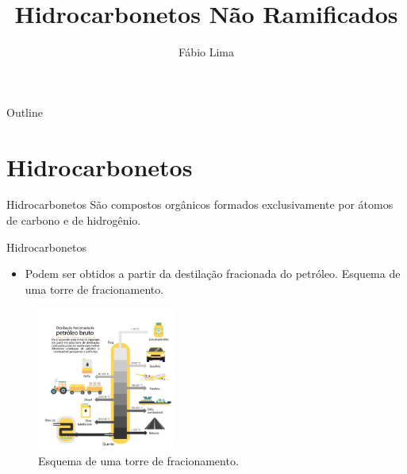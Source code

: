 \documentclass[presentation,professionalfonts,smaller,aspectratio=169]{beamer}
\date{}
\author{Fábio Lima}
\date{}
\title{Hidrocarbonetos Não Ramificados}
\begin{document}
\maketitle
\begin{frame}{Outline}
\tableofcontents
\end{frame}




\section{Hidrocarbonetos}
\label{sec:orgd259638}
\begin{frame}[label={sec:orgb4105b0}]{Hidrocarbonetos}
São compostos orgânicos formados exclusivamente por átomos de carbono e de hidrogênio.
%
\end{frame}



\begin{frame}[label={sec:orgdbf5b60}]{Hidrocarbonetos}
\begin{itemize}
\item Podem ser obtidos a partir da destilação fracionada do petróleo. Esquema de uma torre de fracionamento.
\end{itemize}

\begin{figure}[htbp]
\centering
\includegraphics[width=0.4\textwidth]{QO/Hidrocarbonetos/torre.jpg}
\caption{\label{fig:org3022ad4}Esquema de uma torre de fracionamento.}
\end{figure}
\end{frame}
\end{document}
